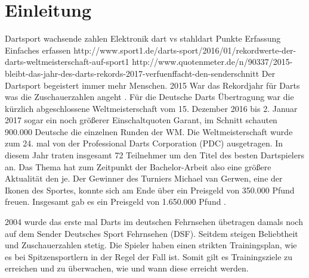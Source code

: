 
\chapter{Einleitung}
\label{chap:intro}

Dartsport wachsende zahlen
Elektronik dart vs stahldart
Punkte Erfassung
Einfaches erfassen
http://www.sport1.de/darts-sport/2016/01/rekordwerte-der-darts-weltmeisterschaft-auf-sport1
http://www.quotenmeter.de/n/90337/2015-bleibt-das-jahr-des-darts-rekords-2017-verfuenffacht-den-senderschnitt
Der Dartsport begeistert immer mehr Menschen. 2015 War das Rekordjahr für Darts was die Zuschauerzahlen angeht . Für die Deutsche Darts Übertragung war die kürzlich abgeschlossene Weltmeisterschaft vom 15. Dezember 2016 bis 2. Januar 2017 sogar ein noch größerer Einschaltquoten Garant, im Schnitt schauten 900.000 Deutsche die einzelnen Runden der WM.  Die Weltmeisterschaft wurde zum 24. mal von der Professional Darts Corporation (PDC) ausgetragen. In diesem Jahr traten insgesamt 72 Teilnehmer um den Titel des besten Dartspielers an. Das Thema hat zum Zeitpunkt der Bachelor-Arbeit also eine größere Aktualität den je. Der Gewinner des Turniers Michael van Gerwen, eine der Ikonen des Sportes, konnte sich am Ende über ein Preisgeld von 350.000 Pfund freuen. Insgesamt gab es ein Preisgeld von 1.650.000 Pfund \autocite{PDC2016}.

2004 wurde das erste mal Darts im deutschen Fehrnsehen übetragen damals noch auf dem Sender Deutsches Sport Fehrnsehen (DSF)\autocite{GaOn2016}. Seitdem steigen Beliebtheit und Zuschauerzahlen stetig.
Die Spieler haben einen strikten Trainingsplan, wie es bei Spitzensportlern in der Regel der Fall ist. 
Somit gilt es Trainingsziele zu erreichen und zu überwachen, wie und wann diese erreicht werden.

